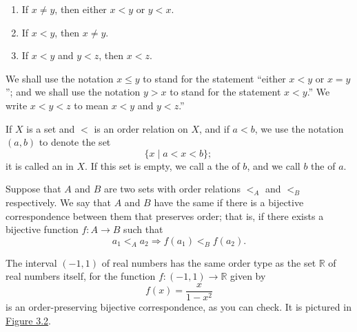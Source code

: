 \begin{enumerate}[itemsep=0.2em, parsep=0pt, topsep=0pt, partopsep=0pt, leftmargin=*, label=(\arabic*), align=left]
\item If \(x \neq y\), then either \(x < y\) or \(y < x\).

\item If \(x < y\), then \(x \neq y\).

\item If \(x < y\) and \(y < z\), then \(x < z\).
\end{enumerate}
We shall use the notation \(x \leq y\) to stand for the statement 
``either \(x < y\) or \(x = y\)''; and we shall use the notation \(y > x\) 
to stand for the statement \(x < y\).'' We write \(x < y < z\) to mean 
\(x < y\) and \(y < z\).''

\begin{definition}
 If \(X\) is a set and \(<\) is an order relation on \(X\), and if \(a < b\), we use the notation \((a, b)\) to denote the set
 \[
 \{ x \mid a < x < b\} \text{; }
 \]
 it is called an  in \(X\). If this set is empty, we call a the  of \(b\), and we call \(b\) the  of \(a\).
\end{definition}


\begin{definition}
 Suppose that \(A\) and \(B\) are two sets with order relations \({ < }_{A}\) and \({ < }_{B}\) respectively. We say that \(A\) and \(B\) have the same  if there is a bijective correspondence between them that preserves order; that is, if there exists a bijective function \(f : A \rightarrow B\) such that
 \[
 a_{1}{ < }_{A}a_{2} \Rightarrow f(a_{1}) { < }_{B}f(a_{2}).
 \]
\end{definition}

\begin{centeredblock}
 \begin{example}
\label{ex:\thesection.\theexample}
 The interval \((-1, 1)\) of real numbers has the same order type as the set \(\mathbb{R}\) of real numbers itself, for the function \(f : ({-1,1}) \rightarrow \mathbb{R}\) given by
 \[
 f(x) = \frac{x}{1 - x^{2}}
 \]
 is an order-preserving bijective correspondence, as you can check. It is pictured in \hyperref[fig:3.2]{Figure 3.2}.
 \end{example}
\end{centeredblock}

